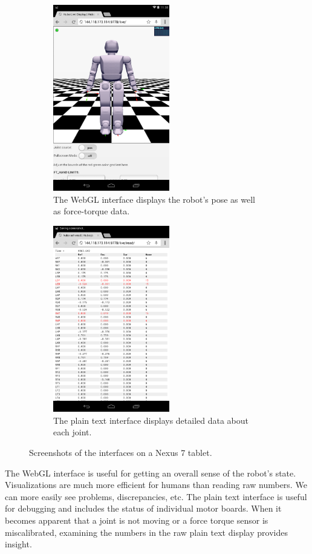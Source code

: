 \documentclass[letterpaper, 10 pt, conference]{ieee/ieeeconf}  %
\begin{document}
\begin{figure}[ptb]
    \centering
    \begin{subfigure}[b]{2.5in}
        \centering
        \includegraphics[width=2in]{figures/QualitativePortrait.png}
        \caption{The WebGL interface displays the robot's pose as well as force-torque data.}
        \label{fig:Qualitative}
    \end{subfigure}%
    \quad
    \begin{subfigure}[b]{2.5in}
        \centering
        \includegraphics[width=2in]{figures/QuantitativePortrait.png}
        \caption{The plain text interface displays detailed data about each joint. }
        \label{fig:Quantitative}
    \end{subfigure}%
    \caption{Screenshots of the interfaces on a Nexus 7 tablet.}
    \label{fig:Screenshots}
\end{figure}

The WebGL interface is useful for getting an overall sense of the robot's state.
Visualizations are much more efficient for humans than reading raw numbers.
We can more easily see problems, discrepancies, etc.
The plain text interface is useful for debugging and includes the status of individual motor boards.
When it becomes apparent that a joint is not moving or a force torque sensor is miscalibrated, examining the numbers in the raw plain text display provides insight.
\end{document}
